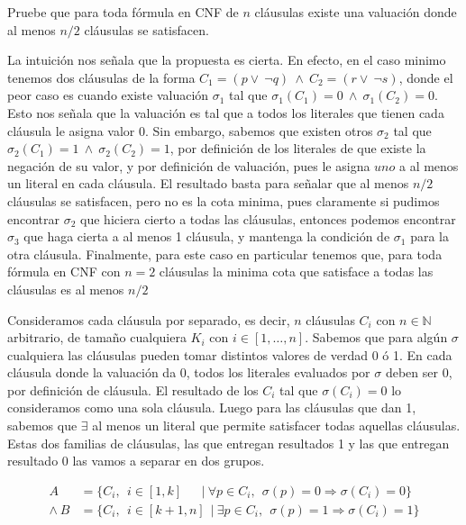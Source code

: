 \documentclass[letterpaper,10pt]{article}
\begin{document}
\begin{tcolorbox}
 Pruebe que para toda fórmula en CNF de $n$ cláusulas existe una valuación donde al menos $n/2$ cláusulas se satisfacen.
\end{tcolorbox}

La intuición nos señala que la propuesta es cierta. En efecto, en el caso minimo tenemos dos cláusulas de la forma $C_1 = (p \vee\ \neg q)\ \wedge\ C_2 = (r \vee\ \neg s)$, donde el peor caso es cuando existe valuación $\sigma_1$ tal que $\sigma_1 (C_1) =0\ \wedge\ \sigma_1 (C_2) =0$. Esto nos señala que la valuación es tal que a todos los literales que tienen cada cláusula le asigna valor $0$. Sin embargo, sabemos que existen otros $\sigma_2$ tal que $\sigma_2(C_1) = 1\ \wedge\ \sigma_2(C_2)=1$, por definición de los literales de que existe la negación de su valor, y por definición de valuación, pues le asigna $uno$ a al menos un literal en cada cláusula. El resultado basta para señalar que al menos $n/2$ cláusulas se satisfacen, pero no es la cota minima, pues claramente si pudimos encontrar $\sigma_2$ que hiciera cierto a todas las cláusulas, entonces podemos encontrar $\sigma_3$ que haga cierta a al menos 1 cláusula, y mantenga la condición de $\sigma_1$ para la otra cláusula. Finalmente, para este caso en particular tenemos que, para toda fórmula en CNF con $n=2$ cláusulas la minima cota que satisface a todas las cláusulas es al menos $n/2$

Consideramos cada cláusula por separado, es decir, $n$ cláusulas $C_i$ con $n \in \mathbb{N}$ arbitrario, de tamaño cualquiera $K_i$ con $i \in [1,\ldots,n]$. Sabemos que para algún $\sigma$ cualquiera las cláusulas pueden tomar distintos valores de verdad 0 ó 1. En cada cláusula donde la valuación da 0, todos los literales evaluados por $\sigma$ deben ser 0, por definición de cláusula. El resultado de los $C_i$ tal que $\sigma(C_i) = 0$ lo consideramos como una sola cláusula. Luego para las cláusulas que dan 1, sabemos que $\exists$ al menos un literal que permite satisfacer todas aquellas cláusulas. Estas dos familias de cláusulas, las que entregan resultados 1 y las que entregan resultado 0 las vamos a separar en dos grupos. 

\begin{align*}
A &= \{C_i,\ \ i\in [1,k]\ \  \ \ \ \ \ \big|\ \forall p \in C_i,\ \  \sigma(p) = 0 \Rightarrow  \sigma(C_i) = 0\}\ \\
\wedge\ B &= \{C_i,\ \ i\in [k+1,n]\ \ \big|\ \exists p \in C_i,\ \  \sigma(p) = 1 \Rightarrow  \sigma(C_i) = 1 \}
\end{align*}
\end{document}
